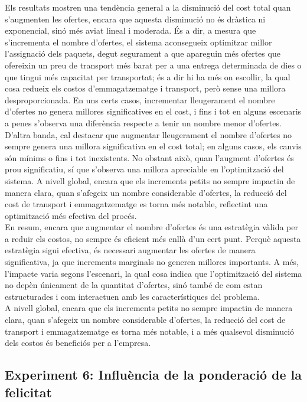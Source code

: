 \documentclass[a4paper]{article}
\begin{document}
	Els resultats mostren una tendència general a la disminució del cost total quan s'augmenten les ofertes, encara que aquesta disminució no és dràstica ni exponencial, sinó més aviat lineal i moderada. És a dir, a mesura que s'incrementa el nombre d'ofertes, el sistema aconsegueix optimitzar millor l'assignació dels paquets, degut segurament a que apareguin més ofertes que ofereixin un preu de transport més barat per a una entrega determinada de dies o que tingui més capacitat per transportat; és a dir hi ha més on escollir, la qual cosa redueix els costos d'emmagatzematge i transport, però sense una millora desproporcionada. En uns certs casos, incrementar lleugerament el nombre d'ofertes no genera millores significatives en el cost, i fins i tot en alguns escenaris a penes s'observa una diferència respecte a tenir un nombre menor d'ofertes.\\
	D'altra banda, cal destacar que augmentar lleugerament el nombre d'ofertes no sempre genera una millora significativa en el cost total; en alguns casos, els canvis són mínims o fins i tot inexistents. No obstant això, quan l'augment d'ofertes és prou significatiu, sí que s'observa una millora apreciable en l'optimització del sistema. A nivell global, encara que els increments petits no sempre impactin de manera clara, quan s'afegeix un nombre considerable d'ofertes, la reducció del cost de transport i emmagatzematge es torna més notable, reflectint una optimització més efectiva del procés.\\
	En resum, encara que augmentar el nombre d'ofertes és una estratègia vàlida per a reduir els costos, no sempre és eficient més enllà d'un cert punt. Perquè aquesta estratègia sigui efectiva, és necessari augmentar les ofertes de manera significativa, ja que increments marginals no generen millores importants. A més, l'impacte varia segons l'escenari, la qual cosa indica que l'optimització del sistema no depèn únicament de la quantitat d'ofertes, sinó també de com estan estructurades i com interactuen amb les característiques del problema.\\
	A nivell global, encara que els increments petits no sempre impactin de manera clara, quan s'afegeix un nombre considerable d'ofertes, la reducció del cost de transport i emmagatzematge es torna més notable, i a més qualsevol disminució dels costos és beneficiós per a l'empresa.\\
	
	\subsection{Experiment 6: Influència de la ponderació de la felicitat}
	
\end{document}
